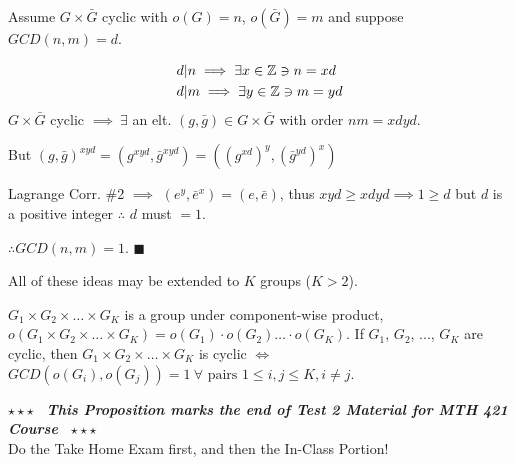 \begin{proposition}
\noindent Assume $G\times \bar{G}$ cyclic with $o(G)=n$, $o(\bar{G})=m$ and suppose $GCD(n,m)=d$.

\begin{align}
&d | n \implies \exists x\in {\mathbb{Z}} \ni n=xd \nonumber \\
&d | m \implies \exists y\in {\mathbb{Z}} \ni m=yd \nonumber
\end{align}
$G\times \bar{G}$ cyclic $\implies \ \exists $ an elt. $(g,\bar{g})\in G\times \bar{G}$ with order
$nm=xdyd$. \steezybreak

\noindent But $(g,\bar{g})^{xyd} = (g^{xyd},\bar{g}^{xyd})=((g^{xd})^y, (\bar{g}^{yd})^x)$
\steezybreak

\noindent Lagrange Corr. \#2 $\implies$ $(e^y,\bar{e}^x)=(e,\bar{e})$, thus
$xyd \geq xdyd \implies 1\geq d$ but $d$ is a positive integer $\therefore$ $d$ must
$=1$.\steezybreak

\noindent $\therefore GCD(n,m)=1$. $\blacksquare$
\end{proposition}

All of these ideas may be extended to $K$ groups ($K>2$). \steezybreak

\noindent $G_1\times G_2 \times \dots \times G_K$ is a group under component-wise product,
$o(G_1\times G_2\times \dots \times G_K)=o(G_1)\cdot o(G_2) \dots \cdot o(G_K)$. If $G_1$, $G_2$,
..., $G_K$ are cyclic, then $G_1\times G_2\times \dots \times G_K$ is cyclic $\iff$
$GCD(o(G_i),o(G_j))=1 \ \forall \text{ pairs } 1\leq i,j\leq K, i\neq j$.

\steezybreak
\begin{tcolorbox}
\begin{center}
    $\star\star\star$ \textbf{\textit{~This Proposition marks the end of Test 2 Material for MTH 421
    Course~}} $\star\star\star$ \\
    Do the Take Home Exam first, and then the In-Class Portion!
\end{center}
\end{tcolorbox}

